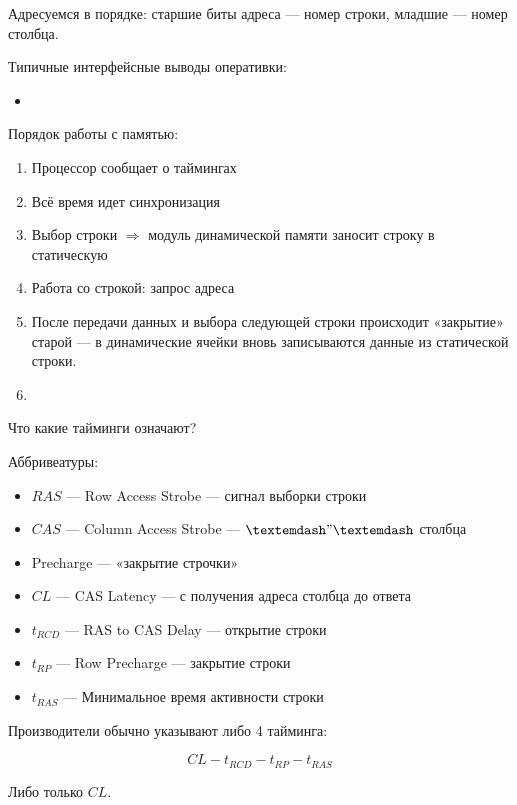 \documentclass[12pt, a4paper]{article}
\begin{document}
Адресуемся в порядке: старшие биты адреса — номер строки, младшие — номер столбца.

Типичные интерфейсные выводы оперативки:

\begin{itemize}
    \item 
\end{itemize}

Порядок работы с памятью: 
\begin{enumerate}
    \item Процессор сообщает о таймингах
    \item Всё время идет синхронизация 
    \item Выбор строки $\Rightarrow$ модуль динамической памяти заносит строку в статическую
    \item Работа со строкой: запрос адреса
    \item После передачи данных и выбора следующей строки происходит «закрытие» старой 
    — в динамические ячейки вновь записываются данные из статической строки.
    \item 
\end{enumerate}

Что какие тайминги означают?

Аббривеатуры: 
\begin{itemize}
    \item $RAS$ — Row Access Strobe — сигнал выборки строки
    \item $CAS$ — Column Access Strobe — $—"—$ столбца
    \item Precharge — «закрытие строчки»
\end{itemize}

\begin{itemize}
    \item $CL$ — CAS Latency — с получения адреса столбца до ответа
    \item $t_{RCD}$ — RAS to CAS Delay — открытие строки
    \item $t_{RP}$ — Row Precharge — закрытие строки
    \item $t_{RAS}$ — Минимальное время активности строки
\end{itemize}


Производители обычно указывают либо 4 тайминга:

\begin{equation*}
    CL - t_{RCD} - t_{RP} - t_{RAS}
\end{equation*}

Либо только $CL$.
\end{document}
